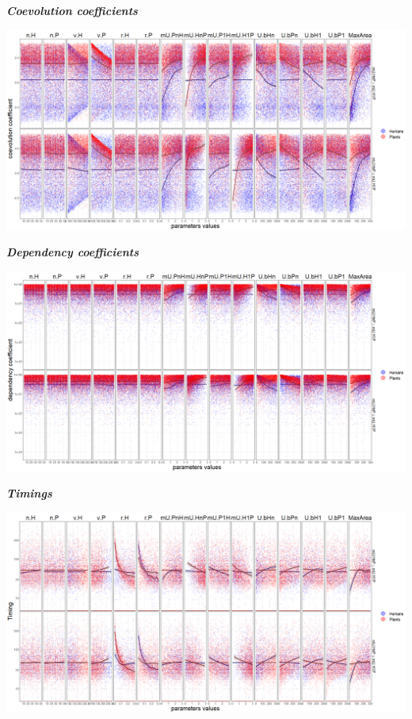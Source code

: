 \documentclass[
]{book}
\begin{document}

\textbf{\emph{Coevolution coefficients}}

\includegraphics[width=1\linewidth]{plots/5_multiplePar-coevo-humanImprove-ggplot}

\textbf{\emph{Dependency coefficients}}

\includegraphics[width=1\linewidth]{plots/5_multiplePar-depend-humanImprove-ggplot}

\textbf{\emph{Timings}}

\includegraphics[width=1\linewidth]{plots/5_multiplePar-timing-humanImprove-ggplot}
\end{document}
